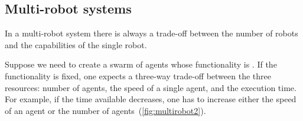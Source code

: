 \begin{figure}[h]
    \begin{center}
    \end{center}
    \caption{ \label{fig:networklink}}
\end{figure}

\subsection{Multi-robot systems}

In a multi-robot system there is always a trade-off between the number
of robots and the capabilities of the single robot.
\begin{example}
    Suppose we need to create a swarm of agents whose functionality is
    . If the functionality is fixed, one expects
    a three-way trade-off between the three resources: number of agents,
    the speed of a single agent, and the execution time. For example,
    if the time available decreases, one has to increase either the speed
    of an agent or the number of agents~(\cref{fig:multirobot2}).
\end{example}


\begin{figure}[h]
    \caption{}
\end{figure}


